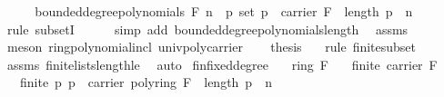 \begin{isabellebody}
%
\isadelimproof
%
\endisadelimproof
%
\isatagproof
{}\isamarkupfalse%
\ {\isacharminus}{\kern0pt}\isanewline
\ \ \isamarkupfalse%
\ {\isachardoublequoteopen}bounded{\isacharunderscore}{\kern0pt}degree{\isacharunderscore}{\kern0pt}polynomials\ F\ n\ {\isasymsubseteq}\ {\isacharbraceleft}{\kern0pt}p{\isachardot}{\kern0pt}\ set\ p\ {\isasymsubseteq}\ carrier\ F\ {\isasymand}\ length\ p\ {\isasymle}\ n{\isacharbraceright}{\kern0pt}{\isachardoublequoteclose}\isanewline
\ \ \ \ \isamarkupfalse%
\ {\isacharparenleft}{\kern0pt}rule\ subsetI{\isacharparenright}{\kern0pt}\isanewline
\ \ \ \ \isamarkupfalse%
\ {\isacharparenleft}{\kern0pt}simp\ add{\isacharcolon}{\kern0pt}\ bounded{\isacharunderscore}{\kern0pt}degree{\isacharunderscore}{\kern0pt}polynomials{\isacharunderscore}{\kern0pt}length{\isacharparenright}{\kern0pt}\ \isamarkupfalse%
\ assms{\isacharparenleft}{\kern0pt}{}{\isacharparenright}{\kern0pt}\ \isanewline
\ \ \ \ \isamarkupfalse%
\ {\isacharparenleft}{\kern0pt}meson\ ring{\isachardot}{\kern0pt}polynomial{\isacharunderscore}{\kern0pt}incl\ univ{\isacharunderscore}{\kern0pt}poly{\isacharunderscore}{\kern0pt}carrier{\isacharparenright}{\kern0pt}\isanewline
\ \ \isamarkupfalse%
\ {\isacharquery}{\kern0pt}thesis\ \ \isamarkupfalse%
\ {\isacharparenleft}{\kern0pt}rule\ finite{\isacharunderscore}{\kern0pt}subset{\isacharparenright}{\kern0pt}\isanewline
\ \ \ \ \isamarkupfalse%
\ assms{\isacharparenleft}{\kern0pt}{}{\isacharparenright}{\kern0pt}\ finite{\isacharunderscore}{\kern0pt}lists{\isacharunderscore}{\kern0pt}length{\isacharunderscore}{\kern0pt}le\ \isamarkupfalse%
\ auto\isanewline
{}\isamarkupfalse%
%
\endisatagproof
{\isafoldproof}%
%
\isadelimproof
\isanewline
%
\endisadelimproof
\isanewline
{}\isamarkupfalse%
\ fin{\isacharunderscore}{\kern0pt}fixed{\isacharunderscore}{\kern0pt}degree{\isacharcolon}{\kern0pt}\isanewline
\ \ \ {\isachardoublequoteopen}ring\ F{\isachardoublequoteclose}\isanewline
\ \ \ {\isachardoublequoteopen}finite\ {\isacharparenleft}{\kern0pt}carrier\ F{\isacharparenright}{\kern0pt}{\isachardoublequoteclose}\isanewline
\ \ \ {\isachardoublequoteopen}finite\ {\isacharbraceleft}{\kern0pt}p{\isachardot}{\kern0pt}\ p\ {\isasymin}\ carrier\ {\isacharparenleft}{\kern0pt}poly{\isacharunderscore}{\kern0pt}ring\ F{\isacharparenright}{\kern0pt}\ {\isasymand}\ length\ p\ {\isacharequal}{\kern0pt}\ n{\isacharbraceright}{\kern0pt}{\isachardoublequoteclose}\isanewline

\end{isabellebody}
